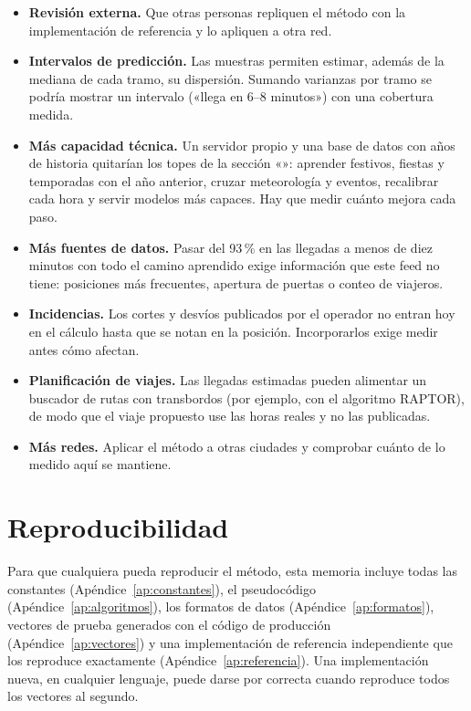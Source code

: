 \begin{itemize}
        estimar la salida real; hay que medir antes si se repite.
  \item \textbf{Revisión externa.} Que otras personas repliquen el método con la implementación de referencia y lo
        apliquen a otra red.
  \item \textbf{Intervalos de predicción.} Las muestras permiten estimar, además de la mediana de cada tramo, su
        dispersión. Sumando varianzas por tramo se podría mostrar un intervalo («llega en 6--8 minutos») con una
        cobertura medida.
  \item \textbf{Más capacidad técnica.} Un servidor propio y una base de datos con años de historia quitarían los
        topes de la sección «»: aprender festivos, fiestas y temporadas con el año
        anterior, cruzar meteorología y eventos, recalibrar cada hora y servir modelos más capaces. Hay que medir
        cuánto mejora cada paso.
  \item \textbf{Más fuentes de datos.} Pasar del 93\,\% en las llegadas a menos de diez minutos con todo el camino
        aprendido exige información que este feed no tiene: posiciones
        más frecuentes, apertura de puertas o conteo de viajeros.
  \item \textbf{Incidencias.} Los cortes y desvíos publicados por el operador no entran hoy en el cálculo hasta que se
        notan en la posición. Incorporarlos exige medir antes cómo afectan.
  \item \textbf{Planificación de viajes.} Las llegadas estimadas pueden alimentar un buscador de rutas con transbordos
        (por ejemplo, con el algoritmo RAPTOR), de modo que el viaje propuesto use las horas reales y no las
        publicadas.
  \item \textbf{Más redes.} Aplicar el método a otras ciudades y comprobar cuánto de lo medido aquí se mantiene.
\end{itemize}

\section{Reproducibilidad}

Para que cualquiera pueda reproducir el método, esta memoria incluye todas las constantes
(Apéndice~\ref{ap:constantes}), el pseudocódigo (Apéndice~\ref{ap:algoritmos}), los formatos de datos
(Apéndice~\ref{ap:formatos}), vectores de prueba generados con el código de producción (Apéndice~\ref{ap:vectores}) y
una implementación de referencia independiente que los reproduce exactamente (Apéndice~\ref{ap:referencia}). Una
implementación nueva, en cualquier lenguaje, puede darse por correcta cuando reproduce todos los vectores al segundo.
